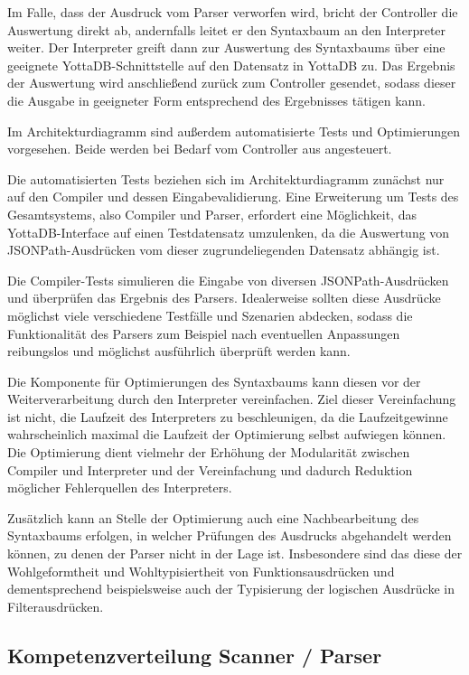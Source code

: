 \documentclass[oneside]{ausarbeitung}
\begin{document}
Im Falle, dass der Ausdruck vom Parser verworfen wird, bricht der Controller die Auswertung direkt ab, andernfalls leitet er den Syntaxbaum an den Interpreter weiter. Der Interpreter greift dann zur Auswertung des Syntaxbaums über eine geeignete YottaDB-Schnittstelle auf den Datensatz in YottaDB zu. Das Ergebnis der Auswertung wird anschließend zurück zum Controller gesendet, sodass dieser die Ausgabe in geeigneter Form entsprechend des Ergebnisses tätigen kann. 

Im Architekturdiagramm sind außerdem automatisierte Tests und Optimierungen vorgesehen. Beide werden bei Bedarf vom Controller aus angesteuert.

Die automatisierten Tests beziehen sich im Architekturdiagramm zunächst nur auf den Compiler und dessen Eingabevalidierung. Eine Erweiterung um Tests des Gesamtsystems, also Compiler und Parser, erfordert eine Möglichkeit, das YottaDB-Interface auf einen Testdatensatz umzulenken, da die Auswertung von JSONPath-Ausdrücken vom dieser zugrundeliegenden Datensatz abhängig ist. 

Die Compiler-Tests simulieren die Eingabe von diversen JSONPath-Ausdrücken und überprüfen das Ergebnis des Parsers. Idealerweise sollten diese Ausdrücke möglichst viele verschiedene Testfälle und Szenarien abdecken, sodass die Funktionalität des Parsers zum Beispiel nach eventuellen Anpassungen reibungslos und möglichst ausführlich überprüft werden kann.

Die Komponente für Optimierungen des Syntaxbaums kann diesen vor der Weiterverarbeitung durch den Interpreter vereinfachen. Ziel dieser Vereinfachung ist nicht, die Laufzeit des Interpreters zu beschleunigen, da die Laufzeitgewinne wahrscheinlich maximal die Laufzeit der Optimierung selbst aufwiegen können. Die Optimierung dient vielmehr der Erhöhung der Modularität zwischen Compiler und Interpreter und der Vereinfachung und dadurch Reduktion möglicher Fehlerquellen des Interpreters.

Zusätzlich kann an Stelle der Optimierung auch eine Nachbearbeitung des Syntaxbaums erfolgen, in welcher Prüfungen des Ausdrucks abgehandelt werden können, zu denen der Parser nicht in der Lage ist. Insbesondere sind das diese der Wohlgeformtheit und Wohltypisiertheit von Funktionsausdrücken und dementsprechend beispielsweise auch der Typisierung der logischen Ausdrücke in Filterausdrücken.



\pagebreak

\subsection{Kompetenzverteilung Scanner / Parser}
	
\end{document}
